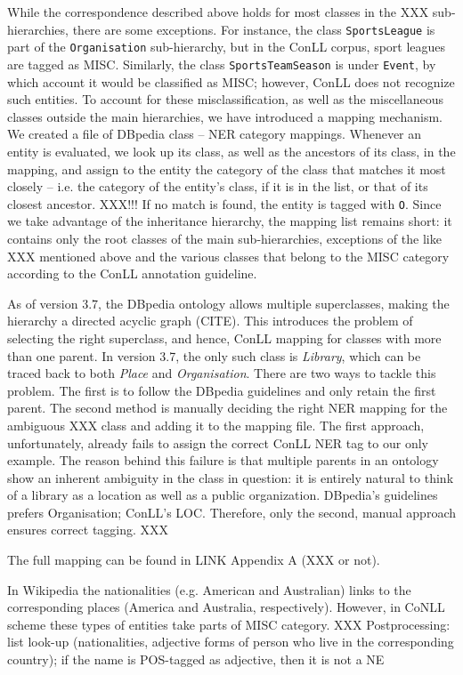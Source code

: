 \documentclass[11pt]{article}
\begin{document}
While the correspondence described above holds for most classes in the XXX sub-hierarchies, there are some exceptions. For instance, the class \texttt{SportsLeague} is part of the \texttt{Organisation} sub-hierarchy, but in the ConLL corpus, sport leagues are tagged as MISC. Similarly, the class \texttt{SportsTeamSeason} is under \texttt{Event}, by which account it would be classified as MISC; however, ConLL does not recognize such entities. To account for these misclassification, as well as the miscellaneous classes outside the main hierarchies, we have introduced a mapping mechanism. We created a file of DBpedia class -- NER category mappings. Whenever an entity is evaluated, we look up its class, as well as the ancestors of its class, in the mapping, and assign to the entity the category of the class that matches it most closely -- i.e. the category of the entity's class, if it is in the list, or that of its closest ancestor. XXX!!! If no match is found, the entity is tagged with \texttt{O}. Since we take advantage of the inheritance hierarchy, the mapping list remains short: it contains only the root classes of the main sub-hierarchies, exceptions of the like XXX mentioned above and the various classes that belong to the MISC category according to the ConLL annotation guideline.

As of version 3.7, the DBpedia ontology allows multiple superclasses, making the hierarchy a directed acyclic graph (CITE). This introduces the problem of selecting the right superclass, and hence, ConLL mapping for classes with more than one parent. In version 3.7, the only such class is \textit{Library}, which can be traced back to both \textit{Place} and \textit{Organisation}. There are two ways to tackle this problem. The first is to follow the DBpedia guidelines and only retain the first parent. The second method is manually deciding the right NER mapping for the ambiguous XXX class and adding it to the mapping file. The first approach, unfortunately, already fails to assign the correct ConLL NER tag to our only example. The reason behind this failure is that multiple parents in an ontology show an inherent ambiguity in the class in question: it is entirely natural to think of a library as a location as well as a public organization. DBpedia's guidelines prefers Organisation; ConLL's LOC. Therefore, only the second, manual approach ensures correct tagging. XXX

The full mapping can be found in LINK Appendix A (XXX or not).

In Wikipedia the nationalities (e.g. American and Australian) links to the corresponding places (America and Australia, respectively). However, in CoNLL scheme these types of entities take parts of MISC category. XXX Postprocessing: list look-up (nationalities, adjective forms of person who live in the corresponding country); if the name is POS-tagged as adjective, then it is not a NE
\end{document}
